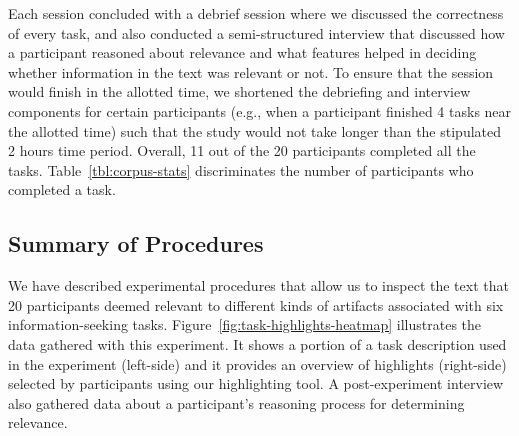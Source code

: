 


Each session concluded with a debrief session where we discussed the
correctness of every task,
and also conducted a semi-structured
interview that discussed how a participant reasoned about relevance
and what features helped in deciding
whether information in the text was relevant or not.
To ensure that the session would finish in the allotted time,
we shortened the debriefing and interview components 
for certain participants
(e.g., when a participant finished 4 tasks near the allotted time)
such that the study would not take longer than the stipulated 2 hours time period.
Overall, 11 out of the 20 participants completed all the tasks.
Table~\ref{tbl:corpus-stats} discriminates the number of participants who completed a task.







\subsection{Summary of Procedures}


We have described experimental procedures that allow us to inspect the 
text that 20 participants deemed relevant to different kinds of artifacts 
associated with six information-seeking tasks. 
Figure~\ref{fig:task-highlights-heatmap} illustrates the data gathered with this experiment. 
It shows a portion of a task description used in the experiment (left-side) and it
provides an overview of highlights (right-side) selected by
participants using our highlighting tool. 
A post-experiment interview also gathered data 
about a participant's
reasoning process for determining relevance.








